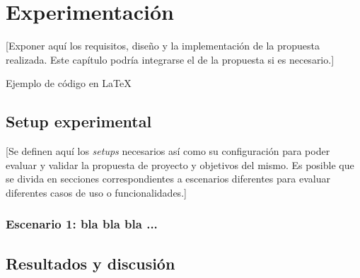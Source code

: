 \chapter{Experimentación}\label{cap:dise-imp}

[Exponer aquí los requisitos, diseño y la implementación de la propuesta realizada. Este capítulo podría integrarse el de la propuesta si es necesario.]

Ejemplo de código en \LaTeX

\section{Setup experimental}

 [Se definen aquí los \textit{setups} necesarios así como su configuración para poder evaluar y validar la propuesta de proyecto y objetivos del mismo. Es posible que se divida en secciones correspondientes a escenarios diferentes para evaluar diferentes casos de uso o funcionalidades.]

\subsection{Escenario 1: bla bla bla ...}

\section{Resultados y discusión}
